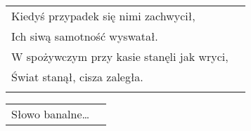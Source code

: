 \documentclass[a5paper]{article}
\begin{document}
\noindent
\begin{tabular}{@{}p{7.50cm}p{3cm}@{}}
Kiedyś przypadek się nimi zachwycił,\\
Ich siwą samotność wyswatał.\\
W spożywczym przy kasie stanęli jak wryci,\\
Świat stanął, cisza zaległa.\\\\
\end{tabular}

\noindent
\begin{tabular}{@{}p{7.50cm}p{3cm}@{}}
Słowo banalne…
\end{tabular}
\end{document}
